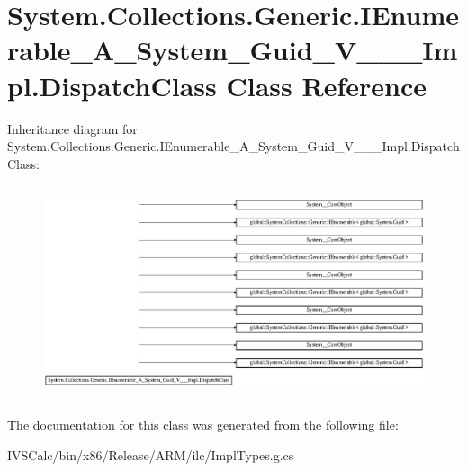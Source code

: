 \hypertarget{class_system_1_1_collections_1_1_generic_1_1_i_enumerable___a___system___guid___v_______impl_1_1_dispatch_class}{}\section{System.\+Collections.\+Generic.\+I\+Enumerable\+\_\+\+A\+\_\+\+System\+\_\+\+Guid\+\_\+\+V\+\_\+\+\_\+\+\_\+\+Impl.\+Dispatch\+Class Class Reference}
\label{class_system_1_1_collections_1_1_generic_1_1_i_enumerable___a___system___guid___v_______impl_1_1_dispatch_class}
Inheritance diagram for System.\+Collections.\+Generic.\+I\+Enumerable\+\_\+\+A\+\_\+\+System\+\_\+\+Guid\+\_\+\+V\+\_\+\+\_\+\+\_\+\+Impl.\+Dispatch\+Class\+:\begin{figure}[H]
\begin{center}
\leavevmode
\includegraphics[height=6.311476cm]{class_system_1_1_collections_1_1_generic_1_1_i_enumerable___a___system___guid___v_______impl_1_1_dispatch_class}
\end{center}
\end{figure}


The documentation for this class was generated from the following file\+:\begin{DoxyCompactItemize}
\item 
I\+V\+S\+Calc/bin/x86/\+Release/\+A\+R\+M/ilc/Impl\+Types.\+g.\+cs\end{DoxyCompactItemize}
